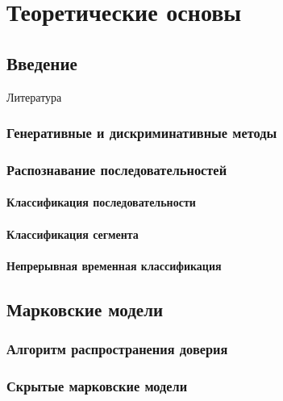 \chapter{Теоретические основы}

\section{Введение}

Литература \cite{шлезингер2004десять, bishop2006pattern, graves2013generating, graves2012supervised, murphy2012machine}

\subsection{Генеративные и дискриминативные методы}

\cite{graves2013generating}

\subsection{Распознавание последовательностей}

\cite{graves2013generating}

\subsubsection{Классификация последовательности}
\subsubsection{Классификация сегмента}
\subsubsection{Непрерывная временная классификация}

\section{Марковские модели}

\cite{rabiner1986, gales2008, young2006htk, Ramage2007, Fosler-Lussier1998, plotz2009markov}

\subsection{Алгоритм распространения доверия}
\subsection{Скрытые марковские модели}


